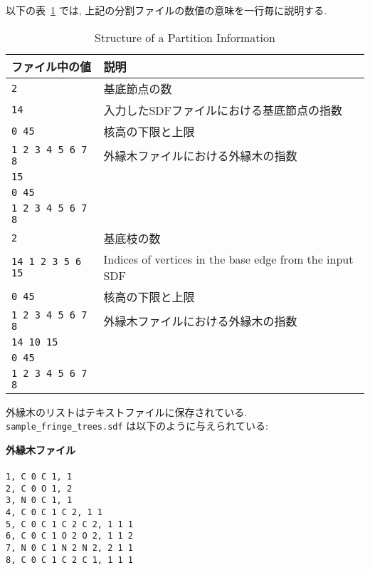 \documentclass[11pt,titlepage,dvipdfmx,twoside]{jarticle}
\begin{document}
以下の表~\ref{tab:PartitionFormat}
では, 上記の分割ファイルの数値の意味を一行毎に説明する.

\bigskip
\begin{table}[H]
\begin{center} \caption{Structure of a Partition Information}
\label{tab:PartitionFormat}
  \begin{tabular}{l|l}
  ファイル中の値 & 説明 \\ \hline \hline
{\tt  2} & 基底節点の数 \\ \hline
{\tt 14}          & 入力したSDFファイルにおける基底節点の指数     \\
{\tt0 45 }       & 核高の下限と上限   \\
{\tt 1 2 3 4 5 6 7 8} & 外縁木ファイルにおける外縁木の指数\\
{\tt15}              &\\
{\tt 0 45}            &\\
{\tt1 2 3 4 5 6 7 8} \\ \hline
{\tt2}         & 基底枝の数     \\ \hline
{\tt 14 1 2 3 5 6 15}  & Indices of vertices in the base edge from the input SDF \\
{\tt 0 45}       &核高の下限と上限      \\
{\tt 1 2 3 4 5 6 7 8}  & 外縁木ファイルにおける外縁木の指数\\
{\tt 14 10 15}    &    \\
{\tt 0 45}            &\\
{\tt 1 2 3 4 5 6 7 8} & \\ \hline

  \end{tabular}
\end{center}
\end{table}
外縁木のリストはテキストファイルに保存されている.
{\tt sample\_fringe\_trees.sdf} は以下のように与えられている: 

\begin{oframed}
{\bf 外縁木ファイル}\\\\
{\tt1, C 0 C 1, 1            \\
2, C 0 O 1, 2            \\
3, N 0 C 1, 1            \\
4, C 0 C 1 C 2, 1 1      \\
5, C 0 C 1 C 2 C 2, 1 1 1\\
6, C 0 C 1 O 2 O 2, 1 1 2\\
7, N 0 C 1 N 2 N 2, 2 1 1\\
8, C 0 C 1 C 2 C 1, 1 1 1}\\
\end{oframed}
\end{document}
